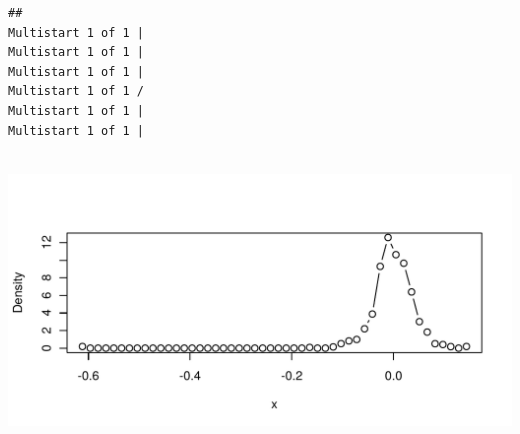 \begin{knitrout}
\color{fgcolor}\begin{kframe}
\begin{alltt}
 \hlkwb{<-} \hlstd{(}
  
  \hlstd{=} \hlstd{,}
  \hlstd{=} \hlstd{,}
  \hlstd{=} 
\hlstd{)}
\end{alltt}
\begin{verbatim}
## 
Multistart 1 of 1 |
Multistart 1 of 1 |
Multistart 1 of 1 |
Multistart 1 of 1 /
Multistart 1 of 1 |
Multistart 1 of 1 |
                   
\end{verbatim}
\begin{alltt}
 \hlkwb{<-} 

  \hlstd{=} \hlstd{)}
\end{alltt}
\end{kframe}
\includegraphics[width=\maxwidth]{figure/unnamed-chunk-26-1} 

\end{knitrout}
